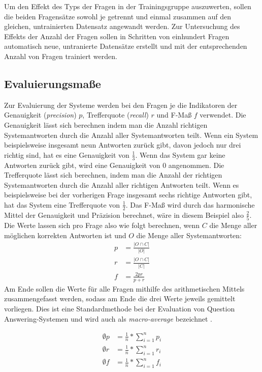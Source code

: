 Um den Effekt des Typs der Fragen in der Trainingsgruppe auszuwerten, sollen die beiden Fragensätze sowohl je getrennt und einmal zusammen auf den gleichen, untrainierten Datensatz angewandt werden.
Zur Untersuchung des Effekts der Anzahl der Fragen sollen in Schritten von einhundert Fragen automatisch neue, untranierte Datensätze erstellt und mit der entsprechenden Anzahl von Fragen trainiert werden.

\subsection{Evaluierungsmaße}

Zur Evaluierung der Systeme werden bei den Fragen je die Indikatoren der Genauigkeit (\emph{precision}) $p$, Trefferquote (\emph{recall}) $r$ und F-Maß $f$ verwendet.
Die Genauigkeit lässt sich berechnen indem man die Anzahl richtigen Systemantworten durch die Anzahl aller Systemantworten teilt.
Wenn ein System beispielsweise insgesamt neun Antworten zurück gibt, davon jedoch nur drei richtig sind, hat es eine Genauigkeit von $\frac{1}{3}$.
Wenn das System gar keine Antworten zurück gibt, wird eine Genauigkeit von $0$ angenommen.
Die Trefferquote lässt sich berechnen, indem man die Anzahl der richtigen Systemantworten durch die Anzahl aller richtigen Antworten teilt.
Wenn es beispielsweise bei der vorherigen Frage insgesamt sechs richtige Antworten gibt, hat das System eine Trefferquote von $\frac{1}{2}$.
Das F-Maß wird durch das harmonische Mittel der Genauigkeit und Präzision berechnet, wäre in diesem Beispiel also $\frac{2}{5}$.
Die Werte lassen sich pro Frage also wie folgt berechnen, wenn $C$ die Menge aller möglichen korrekten Antworten ist und $O$ die Menge aller Systemantworten:
\begin{align*}
  p&=\frac{|O \cap C|}{|O|} \\
  r&=\frac{|O \cap C|}{|C|} \\
  f&=\frac{2pr}{p+r}
\end{align*}
Am Ende sollen die Werte für alle Fragen mithilfe des arithmetischen Mittels zusammengefasst werden, sodass am Ende die drei Werte jeweils gemittelt vorliegen.
Dies ist eine Standardmethode bei der Evaluation von Question Answering-Systemen und wird auch als \emph{macro-average} bezeichnet \citep{qald9}.

\begin{align*}
  \emptyset p&=\frac{1}{n}*\sum_{i=1}^{n}p_i \\
  \emptyset r&=\frac{1}{n}*\sum_{i=1}^{n}r_i \\
  \emptyset f&=\frac{1}{n}*\sum_{i=1}^{n}f_i
\end{align*}

